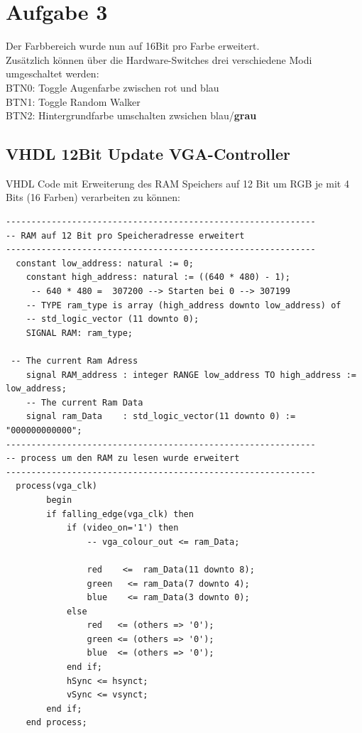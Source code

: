 \section{Aufgabe 3} \label{ex3}
Der Farbbereich wurde nun auf 16Bit pro Farbe erweitert.\\
Zusätzlich können über die Hardware-Switches drei verschiedene Modi umgeschaltet werden:\\

BTN0: Toggle Augenfarbe zwischen rot und blau\\
BTN1: Toggle Random Walker\\
BTN2: Hintergrundfarbe umschalten zwsichen blau/\textbf{grau}

\subsection{VHDL 12Bit Update VGA-Controller}
VHDL Code mit Erweiterung des RAM Speichers auf 12 Bit um RGB je mit 4 Bits (16 Farben) verarbeiten zu können:
\begin{verbatim}
-------------------------------------------------------------
-- RAM auf 12 Bit pro Speicheradresse erweitert
-------------------------------------------------------------
  constant low_address: natural := 0;
    constant high_address: natural := ((640 * 480) - 1);
     -- 640 * 480 =  307200 --> Starten bei 0 --> 307199
    -- TYPE ram_type is array (high_address downto low_address) of 
    -- std_logic_vector (11 downto 0);
    SIGNAL RAM: ram_type;

 -- The current Ram Adress
    signal RAM_address : integer RANGE low_address TO high_address := low_address;
    -- The current Ram Data  
    signal ram_Data    : std_logic_vector(11 downto 0) := "000000000000"; 
-------------------------------------------------------------
-- process um den RAM zu lesen wurde erweitert
-------------------------------------------------------------
  process(vga_clk)      
        begin
        if falling_edge(vga_clk) then
            if (video_on='1') then
                -- vga_colour_out <= ram_Data;     
                  
                red    <=  ram_Data(11 downto 8);
                green   <= ram_Data(7 downto 4);
                blue    <= ram_Data(3 downto 0);
            else
                red   <= (others => '0');
                green <= (others => '0');
                blue  <= (others => '0');
            end if;
            hSync <= hsynct;
            vSync <= vsynct;
        end if;
    end process; 
\end{verbatim}


